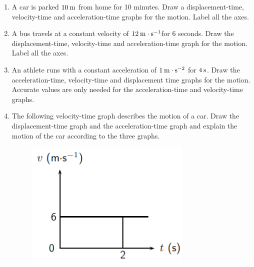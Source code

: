           \label{m38795*id72955}\begin{enumerate}[noitemsep, label=\textbf{\arabic*}. ] 
            \label{m38795*uid116}\item A car is parked \begin{math}10\phantom{\rule{2pt}{0ex}}\mathrm{m}\end{math} from home for 10 minutes. Draw a displacement-time, velocity-time and acceleration-time graphs for the motion. Label all the axes.\newline
            
\label{m38795*uid117}\item A bus travels at a constant velocity of \begin{math}12\phantom{\rule{2pt}{0ex}}\mathrm{m}\ensuremath{\cdot}\mathrm{s}{}^{-1}\end{math}for 6 seconds. Draw the displacement-time, velocity-time and acceleration-time graph for the motion. Label all the axes.\newline
            
\label{m38795*uid118}\item An athlete runs with a constant acceleration of \begin{math}1\phantom{\rule{2pt}{0ex}}\mathrm{m}\ensuremath{\cdot}\mathrm{s}{}^{-2}\end{math} for \begin{math}4\phantom{\rule{2pt}{0ex}}\mathrm{s}\end{math}. Draw the acceleration-time, velocity-time and displacement time graphs for the motion. Accurate values are only needed for the acceleration-time and velocity-time graphs.\newline
            
\label{m38795*uid119}\item The following velocity-time graph describes the motion of a car. Draw the displacement-time graph and the acceleration-time graph and explain the motion of the car according to the three graphs.

    \setcounter{subfigure}{0}


	\begin{figure}[H] %
    \begin{center}
    \label{m38795*id73065!!!underscore!!!media}\label{m38795*id73065!!!underscore!!!printimage}\includegraphics[width=300px]{col11305.imgs/m38795_PG10C2_027.png} %
        

\end{center}
\end{figure}
\end{enumerate}

